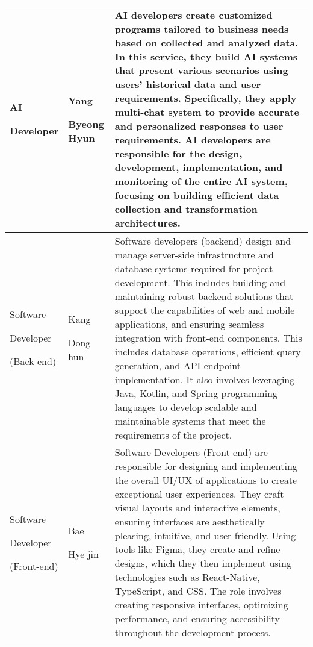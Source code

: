 \documentclass[conference]{IEEEtran}
\begin{document}
\begin{table}
\def\arraystretch{1.24} \small 

\begin{tabular}{|p{1.5cm}|p{1.2cm}|p{4.9cm}|}
    \hline
    AI \par Developer & Yang \par Byeong Hyun & AI developers create customized programs tailored to business needs based on collected and analyzed data. In this service, they build AI systems that present various scenarios using users' historical data and user requirements. Specifically, they apply multi-chat system to provide accurate and personalized responses to user requirements. AI developers are responsible for the design, development, implementation, and monitoring of the entire AI system, focusing on building efficient data collection and transformation architectures.  \\ 
    \hline
    Software \par Developer \par(Back-end) & Kang \par Dong hun & Software developers (backend) design and manage server-side infrastructure and database systems required for project development. This includes building and maintaining robust backend solutions that support the capabilities of web and mobile applications, and ensuring seamless integration with front-end components. This includes database operations, efficient query generation, and API endpoint implementation. It also involves leveraging Java, Kotlin, and Spring programming languages to develop scalable and maintainable systems that meet the requirements of the project. \\ 
    \hline
    Software \par Developer\par(Front-end) & Bae \par Hye jin & Software Developers (Front-end) are responsible for designing and implementing the overall UI/UX of applications to create exceptional user experiences. They craft visual layouts and interactive elements, ensuring interfaces are aesthetically pleasing, intuitive, and user-friendly. Using tools like Figma, they create and refine designs, which they then implement using technologies such as React-Native, TypeScript, and CSS. The role involves creating responsive interfaces, optimizing performance, and ensuring accessibility throughout the development process.\\ 
    \hline
\end{tabular}
\end{table}
\end{document}
